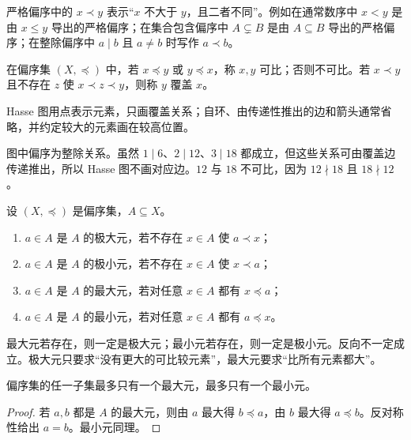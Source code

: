 严格偏序中的 $x\prec y$ 表示“$x$ 不大于 $y$，且二者不同”。例如在通常数序中 $x<y$ 是由 $x\le y$ 导出的严格偏序；在集合包含偏序中 $A\subsetneq B$ 是由 $A\subseteq B$ 导出的严格偏序；在整除偏序中 $a\mid b$ 且 $a\ne b$ 时写作 $a\prec b$。

\begin{definition}\label{ch2-cover-hasse}
在偏序集 $(X,\preceq)$ 中，若 $x\preceq y$ 或 $y\preceq x$，称 $x,y$ 可比；否则不可比。若 $x\prec y$ 且不存在 $z$ 使 $x\prec z\prec y$，则称 $y$ 覆盖 $x$。

Hasse 图用点表示元素，只画覆盖关系；自环、由传递性推出的边和箭头通常省略，并约定较大的元素画在较高位置。
\end{definition}


图中偏序为整除关系。虽然 $1\mid6$、$2\mid12$、$3\mid18$ 都成立，但这些关系可由覆盖边传递推出，所以 Hasse 图不画对应边。$12$ 与 $18$ 不可比，因为 $12\nmid18$ 且 $18\nmid12$。

\begin{definition}\label{ch2-extreme-elements}
设 $(X,\preceq)$ 是偏序集，$A\subseteq X$。
\begin{enumerate}
  \item $a\in A$ 是 $A$ 的极大元，若不存在 $x\in A$ 使 $a\prec x$；
  \item $a\in A$ 是 $A$ 的极小元，若不存在 $x\in A$ 使 $x\prec a$；
  \item $a\in A$ 是 $A$ 的最大元，若对任意 $x\in A$ 都有 $x\preceq a$；
  \item $a\in A$ 是 $A$ 的最小元，若对任意 $x\in A$ 都有 $a\preceq x$。
\end{enumerate}
\end{definition}

最大元若存在，则一定是极大元；最小元若存在，则一定是极小元。反向不一定成立。极大元只要求“没有更大的可比较元素”，最大元要求“比所有元素都大”。

\begin{theorem}[最大元与最小元的唯一性]\label{ch2-greatest-unique}
偏序集的任一子集最多只有一个最大元，最多只有一个最小元。
\end{theorem}

\begin{proof}
若 $a,b$ 都是 $A$ 的最大元，则由 $a$ 最大得 $b\preceq a$，由 $b$ 最大得 $a\preceq b$。反对称性给出 $a=b$。最小元同理。
\end{proof}

